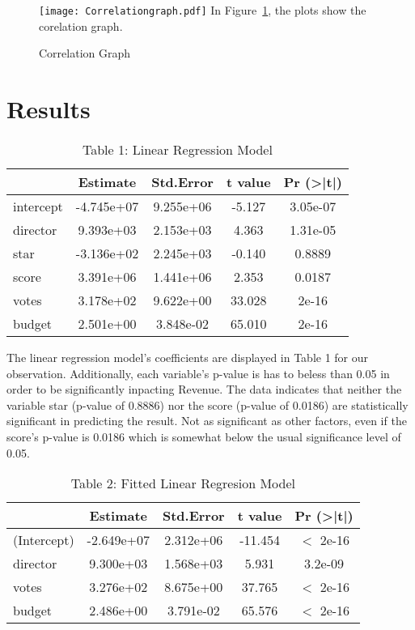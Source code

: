 \documentclass[12pt]{article}
\begin{document}
\begin{figure}
  \centering
	\caption{Correlation Graph}
	\texttt{[image: Correlationgraph.pdf]}
	\label{fig:Correlationgraph}
In Figure~\ref{fig:Correlationgraph}, the plots show the corelation graph.
\end{figure}

\section{Results}
\label{sec:res}

\begin{table}[h]
\centering
\caption{Table 1: Linear Regression Model}
\begin{tabular}{|l|c|c|c|c|}
\hline
 & Estimate   & Std.Error & t value & Pr (\textgreater{}|t|) \\ 
 \hline
intercept & -4.745e+07 & 9.255e+06 & -5.127  & 3.05e-07 \\ 
director  & 9.393e+03  & 2.153e+03 & 4.363   & 1.31e-05 \\ 
star      & -3.136e+02 & 2.245e+03 & -0.140  & 0.8889 \\ 
score     & 3.391e+06  & 1.441e+06 & 2.353   & 0.0187 \\ 
votes     & 3.178e+02  & 9.622e+00 & 33.028  & 2e-16 \\ 
budget    & 2.501e+00  & 3.848e-02 & 65.010  & 2e-16 \\
\hline
\end{tabular}
\end{table}

The linear regression model's coefficients are displayed in Table 1 for our observation. Additionally, each variable's p-value is has to beless than 0.05 in order to be significantly inpacting Revenue. The data indicates that neither the variable star (p-value of 0.8886) nor the score (p-value of 0.0186) are statistically significant in predicting the result. Not as significant as other factors, even if the score's p-value is 0.0186 which is somewhat below the usual significance level of 0.05.

\begin{table}[h]
\centering
\caption{Table 2: Fitted Linear Regresion Model}
\begin{tabular}{|l|c|c|c|c|}
\hline
 & Estimate   & Std.Error & t value & Pr (\textgreater{}|t|) \\ 
\hline
(Intercept) & -2.649e+07 & 2.312e+06 & -11.454 & $<$ 2e-16 \\
director    & 9.300e+03  & 1.568e+03 & 5.931   & 3.2e-09 \\
votes       & 3.276e+02  & 8.675e+00 & 37.765  & $<$ 2e-16 \\
budget      & 2.486e+00  & 3.791e-02 & 65.576  & $<$ 2e-16 \\
\hline
\end{tabular}
\end{table}
\end{document}
